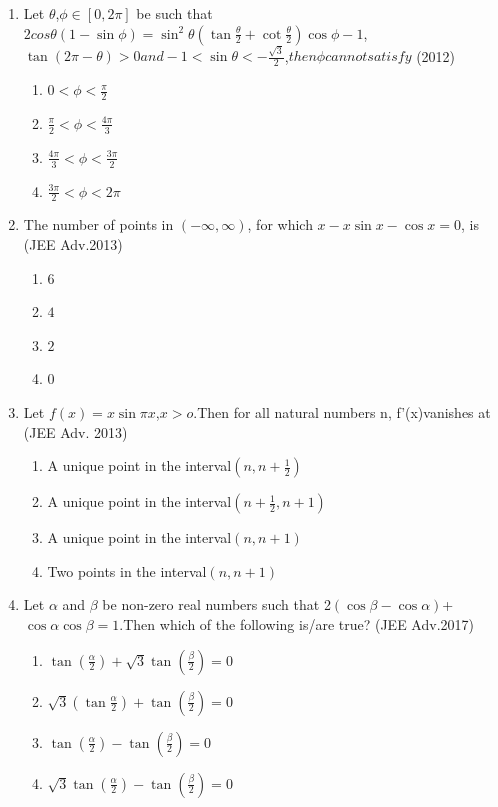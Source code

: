 \documentclass[journal,12pt,twocolumn]{IEEEtran}
\theoremstyle{remark}
\begin{document}
\begin{enumerate}
\item Let $\theta$,$\phi \in[0,2\pi]$ be such that$2 cos\theta(1-\sin\phi)= 
\sin^2\theta(\tan\frac{\theta}{2}+\cot\frac{\theta}{2})\cos\phi-1$,$\tan(2\pi-\theta)>0 and -1<\sin\theta<-\frac{\sqrt{3}}{2}$,$ then \phi cannot satisfy$ \hfill(2012)
\begin{enumerate}
    \item $0<\phi<\frac{\pi}{2}$
    \item $\frac{\pi}{2}<\phi<\frac{4\pi}{3}$
    \item $\frac{4\pi}{3}<\phi<\frac{3\pi}{2}$
    \item $\frac{3\pi}{2}<\phi<2\pi$
\end{enumerate}
\item The number of points in $(-\infty, \infty)$, for which $x - x \sin x - \cos x = 0$, is \hfill(JEE Adv.2013)
\begin{enumerate}
    \item $6$
    \item $4$
    \item $2$
    \item $0$
\end{enumerate}
\item Let $f(x)=x\sin\pi x $,$ x>o $.Then for all  natural numbers n, f'(x)vanishes at
\hfill(JEE Adv. 2013)
\begin{enumerate}
    \item A unique point in the interval$(n,n+\frac{1}{2})$
    \item A unique point in the interval$(n+\frac{1}{2},n+1)$
    \item A unique point in the interval$(n,n+1)$
    \item Two points in the interval$(n,n+1)$
\end{enumerate}
\item Let $\alpha$ and $\beta$ be non-zero real numbers such that 2$(\cos \beta - \cos \alpha)$+$\cos \alpha \cos \beta=1$.Then which of the following is/are true? \hfill(JEE Adv.2017)
\begin{enumerate}
    \item $\tan(\frac{\alpha}{2})+\sqrt{3}\tan(\frac{\beta}{2})=0$
    \item $\sqrt{3}(\tan\frac{\alpha}{2})+\tan(\frac{\beta}{2})=0$
    \item $\tan(\frac{\alpha}{2})-\tan(\frac{\beta}{2})=0$
    \item $\sqrt{3}\tan(\frac{\alpha}{2})-\tan(\frac{\beta}{2})=0$
\end{enumerate}


\end{enumerate}
\end{document}
